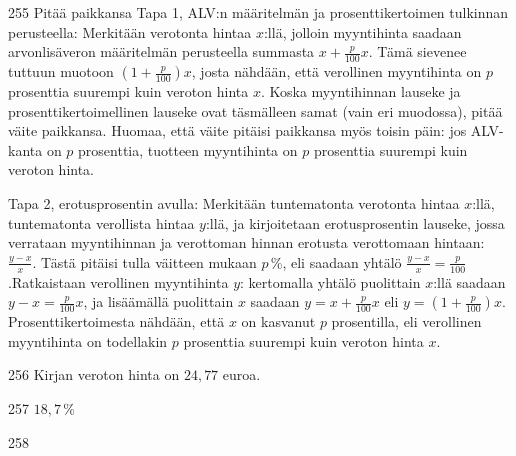 \begin{Vastaus}{255}
	Pitää paikkansa
	 Tapa 1, ALV:n määritelmän ja prosenttikertoimen tulkinnan perusteella: Merkitään verotonta hintaa $x$:llä, jolloin myyntihinta saadaan arvonlisäveron määritelmän perusteella summasta $x+\frac{p}{100}x$. Tämä sievenee tuttuun muotoon $(1+\frac{p}{100})x$, josta nähdään, että verollinen myyntihinta on $p$ prosenttia suurempi kuin veroton hinta $x$. Koska myyntihinnan lauseke ja prosenttikertoimellinen lauseke ovat täsmälleen samat (vain eri muodossa), pitää väite paikkansa. Huomaa, että väite pitäisi paikkansa myös toisin päin: jos ALV-kanta on $p$ prosenttia, tuotteen myyntihinta on $p$ prosenttia suurempi kuin veroton hinta.

	Tapa 2, erotusprosentin avulla: Merkitään tuntematonta verotonta hintaa $x$:llä, tuntematonta verollista hintaa $y$:llä, ja kirjoitetaan erotusprosentin lauseke, jossa verrataan myyntihinnan ja verottoman hinnan erotusta verottomaan hintaan: $\frac{y-x}{x}$. Tästä pitäisi tulla väitteen mukaan $p$\,\%, eli saadaan yhtälö $\frac{y-x}{x}=\frac{p}{100}$.Ratkaistaan verollinen myyntihinta $y$: kertomalla yhtälö puolittain $x$:llä saadaan $y-x=\frac{p}{100}x$, ja lisäämällä puolittain $x$ saadaan $y=x+\frac{p}{100}x$ eli $y=(1+\frac{p}{100})x$. Prosenttikertoimesta nähdään, että $x$ on kasvanut $p$ prosentilla, eli verollinen myyntihinta on todellakin $p$ prosenttia suurempi kuin veroton hinta $x$.
	
\end{Vastaus}
\begin{Vastaus}{256}
        Kirjan veroton hinta on $24,77$ euroa.
    
\end{Vastaus}
\begin{Vastaus}{257}
        $18,7\,\%$
    
\end{Vastaus}
\begin{Vastaus}{258}
	
\end{Vastaus}
